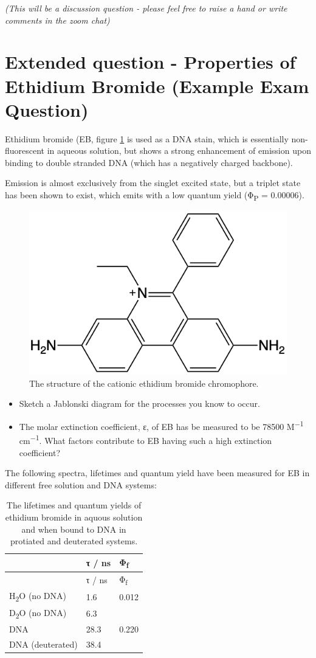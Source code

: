 \documentclass[
]{book}
\begin{document}
\emph{(This will be a discussion question - please feel free to raise a hand or write comments in the zoom chat)}

\hypertarget{extended-question---properties-of-ethidium-bromide-example-exam-question}{%
\section{Extended question - Properties of Ethidium Bromide (Example Exam Question)}\label{extended-question---properties-of-ethidium-bromide-example-exam-question}}

Ethidium bromide (EB, figure \ref{fig:ethidiumstructure} is used as a DNA stain, which is essentially non-fluorescent in aqueous solution, but shows a strong enhancement of emission upon binding to double stranded DNA (which has a negatively charged backbone).

Emission is almost exclusively from the singlet excited state, but a triplet state has been shown to exist, which emits with a low quantum yield (Φ\textsubscript{P} = 0.00006).

\begin{figure}

{\centering \includegraphics[width=0.3\linewidth]{images/ethidiumstructure} 

}

\caption{The structure of the cationic ethidium bromide chromophore.}\label{fig:ethidiumstructure}
\end{figure}

\begin{itemize}
\item
  Sketch a Jablonski diagram for the processes you know to occur.
\item
  The molar extinction coefficient, ε, of EB has be measured to be 78500 M\textsuperscript{−1} cm\textsuperscript{−1}. What factors contribute to EB having such a high extinction coefficient?
\end{itemize}

The following spectra, lifetimes and quantum yield have been measured for EB in different free solution and DNA systems:

\begin{longtable}[]{@{}lll@{}}
\caption{\label{tab:ethidiumlifetime} The lifetimes and quantum yields of ethidium bromide in aquous solution and when bound to DNA in protiated and deuterated systems.}\tabularnewline
\toprule
& τ / ns & Φ\textsubscript{f}\tabularnewline
\midrule
\endfirsthead
\toprule
& τ / ns & Φ\textsubscript{f}\tabularnewline
\midrule
\endhead
H\textsubscript{2}O (no DNA) & 1.6 & 0.012\tabularnewline
D\textsubscript{2}O (no DNA) & 6.3 &\tabularnewline
DNA & 28.3 & 0.220\tabularnewline
DNA (deuterated) & 38.4 &\tabularnewline
\bottomrule
\end{longtable}
\end{document}

